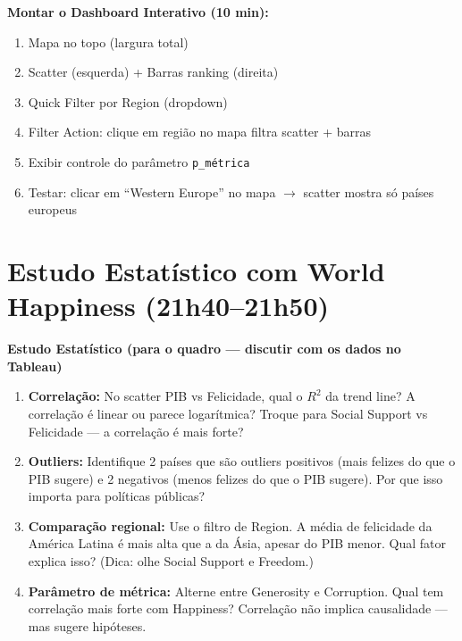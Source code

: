 \begin{SolvedBox}
\textbf{Montar o Dashboard Interativo (10 min):}
\begin{enumerate}
  \item Mapa no topo (largura total)
  \item Scatter (esquerda) + Barras ranking (direita)
  \item Quick Filter por Region (dropdown)
  \item Filter Action: clique em região no mapa filtra scatter + barras
  \item Exibir controle do parâmetro \texttt{p\_métrica}
  \item Testar: clicar em ``Western Europe'' no mapa $\to$
  scatter mostra só países europeus
\end{enumerate}
\end{SolvedBox}

\section{Estudo Estatístico com World Happiness (21h40–21h50)}

\begin{BoardBox}
\textbf{Estudo Estatístico (para o quadro — discutir com os dados no Tableau)}

\begin{enumerate}
  \item \textbf{Correlação:} No scatter PIB vs Felicidade, qual o
  $R^2$ da trend line? A correlação é linear ou parece logarítmica?
  Troque para Social Support vs Felicidade — a correlação é mais forte?

  \item \textbf{Outliers:} Identifique 2 países que são outliers
  positivos (mais felizes do que o PIB sugere) e 2 negativos
  (menos felizes do que o PIB sugere). Por que isso importa para
  políticas públicas?

  \item \textbf{Comparação regional:} Use o filtro de Region.
  A média de felicidade da América Latina é mais alta que a da
  Ásia, apesar do PIB menor. Qual fator explica isso?
  (Dica: olhe Social Support e Freedom.)

  \item \textbf{Parâmetro de métrica:} Alterne entre Generosity
  e Corruption. Qual tem correlação mais forte com Happiness?
  Correlação não implica causalidade — mas sugere hipóteses.
\end{enumerate}
\end{BoardBox}


